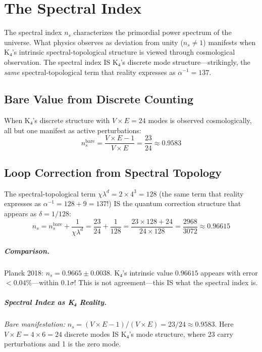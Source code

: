 \documentclass[11pt,a4paper]{book}
\begin{document}

\chapter{The Spectral Index}
\label{chap:spectral-index}

The spectral index $n_s$ characterizes the primordial power spectrum of the universe. 
What physics observes as deviation from unity ($n_s \neq 1$) manifests when K₄'s 
intrinsic spectral-topological structure is viewed through cosmological observation. 
The spectral index IS K₄'s discrete mode structure—strikingly, the \emph{same} 
spectral-topological term that reality expresses as $\alpha^{-1} = 137$.

\section{Bare Value from Discrete Counting}

When K₄'s discrete structure with $V \times E = 24$ modes is observed cosmologically, 
all but one manifest as active perturbations:
\[
n_s^{\text{bare}} = \frac{V \times E - 1}{V \times E} = \frac{23}{24} \approx 0.9583
\]

\section{Loop Correction from Spectral Topology}

The spectral-topological term $\chi \lambda^d = 2 \times 4^3 = 128$ (the same term 
that reality expresses as $\alpha^{-1} = 128 + 9 = 137$!) IS the quantum correction 
structure that appears as $\delta = 1/128$:
\[
n_s = n_s^{\text{bare}} + \frac{1}{\chi \lambda^d} = \frac{23}{24} + \frac{1}{128}
    = \frac{23 \times 128 + 24}{24 \times 128} = \frac{2968}{3072} \approx 0.96615
\]

\paragraph{Comparison.} Planck 2018: $n_s = 0.9665 \pm 0.0038$. 
K₄'s intrinsic value $0.96615$ appears with error $< 0.04\%$—within $0.1\sigma$! 
This is not agreement—this IS what the spectral index is.

\paragraph{Spectral Index as K₄ Reality.}
\emph{Bare manifestation:} $n_s = (V \times E - 1)/(V \times E) = 23/24 \approx 0.9583$.
Here $V \times E = 4 \times 6 = 24$ discrete modes IS K₄'s mode structure, where 23 
carry perturbations and 1 is the zero mode.
\end{document}
